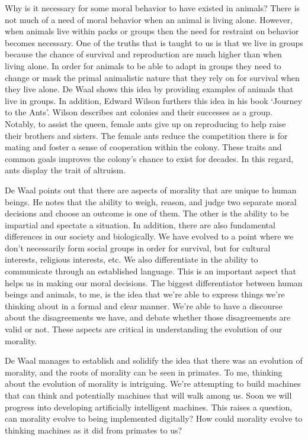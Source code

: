 \documentclass[11pt, oneside]{article}
\begin{document}
\par Why is it necessary for some moral behavior to have existed in animals? There is not much of a need of moral behavior when an animal is living alone. However, when animals live within packs or groups then the need for restraint on behavior becomes necessary. One of the truths that is taught to us is that we live in groups because the chance of survival and reproduction are much higher than when living alone. In order for animals to be able to adapt in groups they need to change or mask the primal animalistic nature that they rely on for survival when they live alone. De Waal shows this idea by providing examples of animals that live in groups. In addition, Edward Wilson furthers this idea in his book `Journey to the Ants'. Wilson describes ant colonies and their successes as a group. Notably, to assist the queen, female ants give up on reproducing to help raise their brothers and sisters. The female ants reduce the competition there is for mating and foster a sense of cooperation within the colony. These traits and common goals improves the colony's chance to exist for decades. In this regard, ants display the trait of altruism. 

\par De Waal points out that there are aspects of morality that are unique to human beings. He notes that the ability to weigh, reason, and judge two separate moral decisions and choose an outcome is one of them. The other is the ability to be impartial and spectate a situation. In addition, there are also fundamental differences in our society and biologically. We have evolved to a point where we don't necessarily form social groups in order for survival, but for cultural interests, religious interests, etc. We also differentiate in the ability to communicate through an established language. This is an important aspect that helps us in making our moral decisions. The biggest differentiator between human beings and animals, to me, is the idea that we're able to express things we're thinking about in a formal and clear manner. We're able to have a discourse about the disagreements we have, and debate whether those disagreements are valid or not. These aspects are critical in understanding the evolution of our morality.

\par De Waal manages to establish and solidify the idea that there was an evolution of morality, and the roots of morality can be seen in primates. To me, thinking about the evolution of morality is intriguing. We're attempting to build machines that can think and potentially machines that will walk among us. Soon we will progress into developing artificially intelligent machines. This raises a question, can morality evolve to being implemented digitally? How could morality evolve to thinking machines as it did from primates to us?
\end{document}

